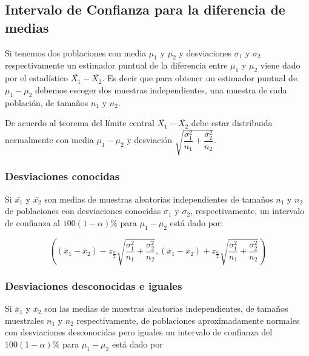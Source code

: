 \documentclass[]{book}
\begin{document}
\hypertarget{intervalo-de-confianza-para-la-diferencia-de-medias}{%
\subsection{Intervalo de Confianza para la diferencia de medias}\label{intervalo-de-confianza-para-la-diferencia-de-medias}}

Si tenemos dos poblaciones con media \(\mu_1\) y \(\mu_2\) y desviaciones \(\sigma_1\) y \(\sigma_2\) respectivamente un estimador puntual de la diferencia entre \(\mu_1\) y \(\mu_2\) viene dado por el estadístico \(\bar{X_1}-\bar{X_2}\). Es decir que para obtener un estimador puntual de \(\mu_1-\mu_2\) debemos escoger dos muestras independientes, una muestra de cada población, de tamaños \(n_1\) y \(n_2\).

De acuerdo al teorema del límite central \(\bar{X_1}-\bar{X_2}\) debe estar distribuida normalmente con media \(\mu_1 - \mu_2\) y desviación \(\sqrt{\dfrac{\sigma_1^2}{n_1} + \dfrac{\sigma_2^2}{n_2}}\).

\hypertarget{desviaciones-conocidas}{%
\subsubsection{Desviaciones conocidas}\label{desviaciones-conocidas}}

Si \(\bar{x_1}\) y \(\bar{x_2}\) son medias de muestras aleatorias independientes de tamaños \(n_1\) y \(n_2\) de poblaciones con desviaciones conocidas \(\sigma_1\) y \(\sigma_2\), respectivamente, un intervalo de confianza al \(100\left(1-\alpha\right)\%\) para \(\mu_1-\mu_2\) está dado por:

\begin{equation} 
\left( \left( \bar{x}_1 - \bar{x}_2 \right) - z_{\frac{\alpha}{2}}\sqrt{\dfrac{\sigma_1^2}{n_1} + \dfrac{\sigma_2^2}{n_2}} , \left( \bar{x}_1 - \bar{x}_2 \right) + z_{\frac{\alpha}{2}}\sqrt{\dfrac{\sigma_1^2}{n_1} + \dfrac{\sigma_2^2}{n_2}} \right) 
\label{eq:ic2msc}
\end{equation}

\hypertarget{desviaciones-desconocidas-e-iguales}{%
\subsubsection{Desviaciones desconocidas e iguales}\label{desviaciones-desconocidas-e-iguales}}

Si \(\bar{x}_1\) y \(\bar{x}_2\) son las medias de muestras aleatorias independientes, de tamaños muestrales \(n_1\) y \(n_2\) respectivamente, de poblaciones aproximadamente normales con desviaciones desconocidas pero iguales un intervalo de confianza del \(100\left(1-\alpha \right)\%\) para \(\mu_1 - \mu_2\) está dado por
\end{document}
